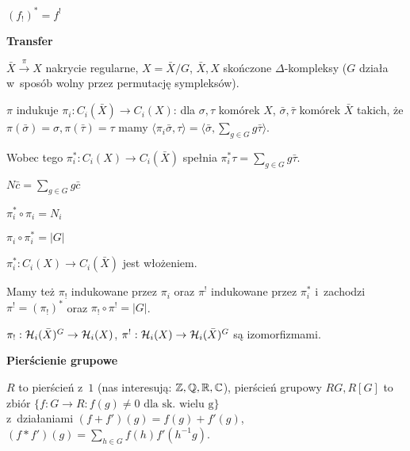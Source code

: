 \begin{wniosek}
	$(f_!)^\ast = f^!$
\end{wniosek}

{\bf Transfer}

$\bar{X} \xrightarrow \pi X$ nakrycie regularne, $X = \bar{X}/G$,
$\bar{X}, X$ skończone $\Delta$-kompleksy ($G$ działa w~sposób wolny
przez permutację sympleksów).

\begin{uwaga}
	$\pi$ indukuje $\pi_i:C_i(\bar{X}) \to C_i(X)$:
	dla $\sigma, \tau$ komórek $X$, 
	$\bar{\sigma}, \bar{\tau}$ komórek $\bar{X}$ takich, że
	$\pi(\bar{\sigma}) = \sigma, \pi(\bar{\tau}) = \tau$
	mamy $\langle \pi_i \bar{\sigma}, \tau \rangle
	= \langle \bar{\sigma}, \sum_{g \in G} g \bar{\tau} \rangle$.
	
	Wobec tego $\pi_i^\ast : C_i(X) \to C_i(\bar{X})$ spełnia
	$\pi_i^\ast \tau = \sum_{g \in G} g \bar{\tau}$.
\end{uwaga}

\begin{definicja}[notacja]
	$N \bar{c} = \sum_{g \in G} g \bar{c}$
\end{definicja}

\begin{wniosek}
	$\pi_i^\ast \circ \pi_i = N_i$
	
	$\pi_i \circ \pi_i^\ast = |G|$
\end{wniosek}

\begin{wniosek}
	$\pi_i^\ast: C_i(X) \to C_i(\bar{X})$ jest włożeniem.
\end{wniosek}

\begin{uwaga}
	Mamy też $\pi_!$ indukowane przez $\pi_i$ 
	oraz $\pi^!$ indukowane przez $\pi_i^\ast$
	i~zachodzi ${\pi^! = (\pi_!)^\ast}$
	oraz $\pi_! \circ \pi^! = |G|$.
\end{uwaga}

\begin{stwierdzenie}
	$\pi_! : {\mathcal{H}}_i(\bar{X})^G \to {\mathcal{H}}_i(X)$, 
	$\pi^! : {\mathcal{H}}_i(X) \to {\mathcal{H}}_i(\bar{X})^G$ są izomorfizmami.
\end{stwierdzenie}
\pagebreak
{\bf Pierścienie grupowe}

\begin{definicja}
	$R$ to pierścień z~$1$ (nas interesują: ${\mathbb{Z}}, {\mathbb{Q}}, {\mathbb{R}}, {\mathbb{C}}$),
	pierścień grupowy $R G, R[G]$ to zbiór
	${\{f: G \to R : f(g) \neq 0\text{ dla sk. wielu g}\}}$
	\\ z~działaniami ${(f+f')(g) = f(g) + f'(g)}$,
	${ (f \ast f')(g) = \sum_{h \in G} f(h) f'(h^{-1} g) }$.
\end{definicja}

